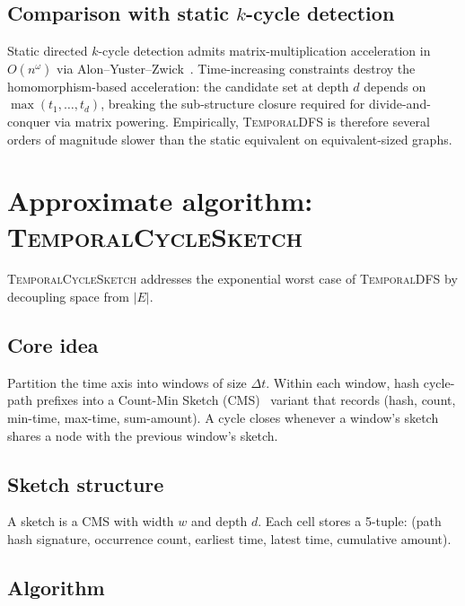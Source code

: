 \documentclass[journal,onecolumn]{IEEEtran}
\begin{document}
\subsection{Comparison with static $k$-cycle detection}
\label{sec:exact-vsstatic}

Static directed $k$-cycle detection admits matrix-multiplication
acceleration in $O(n^{\omega})$ via Alon--Yuster--Zwick~\cite{ayz1995}.
Time-increasing constraints destroy the homomorphism-based acceleration:
the candidate set at depth $d$ depends on $\max(t_1, \ldots, t_d)$,
breaking the sub-structure closure required for divide-and-conquer via
matrix powering. Empirically, \textsc{TemporalDFS} is therefore several
orders of magnitude slower than the static equivalent on equivalent-sized
graphs.

\section{Approximate algorithm: \textsc{TemporalCycleSketch}}
\label{sec:approx}

\textsc{TemporalCycleSketch} addresses the exponential worst case of
\textsc{TemporalDFS} by decoupling space from $|E|$.

\subsection{Core idea}
\label{sec:approx-idea}

Partition the time axis into windows of size $\Delta t$. Within each
window, hash cycle-path prefixes into a Count-Min Sketch (CMS)~\cite{cms2004}
variant that records (hash, count, min-time, max-time, sum-amount). A cycle
closes whenever a window's sketch shares a node with the previous window's
sketch.

\subsection{Sketch structure}
\label{sec:approx-struct}

\begin{definition}
A sketch is a CMS with width $w$ and depth $d$. Each cell stores a
5-tuple: (path hash signature, occurrence count, earliest time, latest
time, cumulative amount).
\end{definition}

\subsection{Algorithm}
\label{sec:approx-alg}
\end{document}

